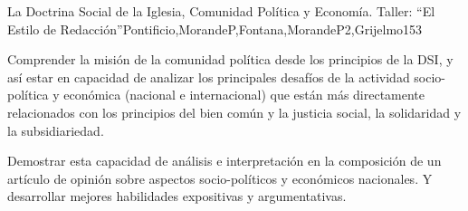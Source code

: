 \begin{syllabus}
\begin{unit}{La Doctrina Social de la Iglesia, Comunidad Política y Economía. Taller: ``El Estilo de Redacción''}{Pontificio,MorandeP,Fontana,MorandeP2,Grijelmo}{15}{3}
\begin{topics}
\end{topics}
\begin{learningoutcomes}
	\item Comprender la misión de la comunidad política desde los principios de la DSI, y así estar en capacidad de analizar los principales desafíos de la actividad socio-política y económica (nacional e internacional) que están más directamente relacionados con los principios del bien común y la justicia social, la solidaridad y la subsidiariedad.
	\item Demostrar esta capacidad de análisis e interpretación en la composición de un artículo de opinión sobre aspectos socio-políticos y económicos nacionales. Y desarrollar mejores habilidades expositivas y argumentativas.
\end{learningoutcomes}
\end{unit}



\begin{coursebibliography}
\end{coursebibliography}
\end{syllabus}
